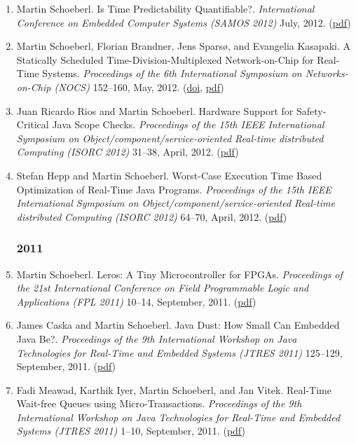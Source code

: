 \begin{enumerate}
\item Martin Schoeberl.
 Is Time Predictability Quantifiable?.
 \emph{International Conference on Embedded Computer Systems (SAMOS 2012)} July, 2012.
(\href{http://www.jopdesign.com/doc/tpquant.pdf}{pdf})

\item Martin Schoeberl, Florian Brandner, Jens Spars{\o}, and Evangelia Kasapaki.
 A Statically Scheduled Time-Division-Multiplexed Network-on-Chip for Real-Time Systems.
 \emph{Proceedings of the 6th International Symposium on Networks-on-Chip (NOCS)} 152--160, May, 2012.
(\href{http://dx.doi.org/10.1109/NOCS.2012.25}{doi}, \href{http://www.jopdesign.com/doc/s4noc.pdf}{pdf})

\item Juan Ricardo Rios and Martin Schoeberl.
 Hardware Support for Safety-Critical Java Scope Checks.
 \emph{Proceedings of the 15th IEEE International Symposium on Object/component/service-oriented Real-time distributed Computing (ISORC 2012)} 31--38, April, 2012.
(\href{http://www.jopdesign.com/doc/hwscope.pdf}{pdf})

\item Stefan Hepp and Martin Schoeberl.
 Worst-Case Execution Time Based Optimization of Real-Time Java Programs.
 \emph{Proceedings of the 15th IEEE International Symposium on Object/component/service-oriented Real-time distributed Computing (ISORC 2012)} 64--70, April, 2012.
(\href{http://www.jopdesign.com/doc/wcetopt.pdf}{pdf})


\subsubsection*{2011}

\item Martin Schoeberl.
 Leros: A Tiny Microcontroller for FPGAs.
 \emph{Proceedings of the 21st International Conference on Field Programmable Logic and Applications (FPL 2011)} 10--14, September, 2011.
(\href{http://www.jopdesign.com/doc/leros.pdf}{pdf})

\item James Caska and Martin Schoeberl.
 Java Dust: How Small Can Embedded Java Be?.
 \emph{Proceedings of the 9th International Workshop on Java Technologies for Real-Time and Embedded Systems (JTRES 2011)} 125--129, September, 2011.
(\href{http://www.jopdesign.com/doc/lerosjvm.pdf}{pdf})

\item Fadi Meawad, Karthik Iyer, Martin Schoeberl, and Jan Vitek.
 Real-Time Wait-free Queues using Micro-Transactions.
 \emph{Proceedings of the 9th International Workshop on Java Technologies for Real-Time and Embedded Systems (JTRES 2011)} 1--10, September, 2011.
(\href{http://www.jopdesign.com/doc/utran.pdf}{pdf})


\end{enumerate}
